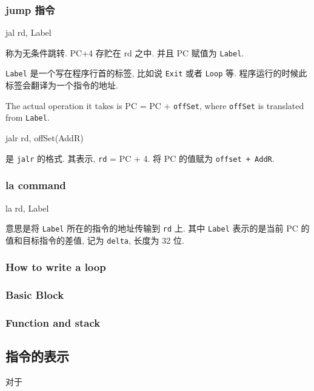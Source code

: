 \documentclass[12pt]{ctexart}
\theoremstyle{definition}
\theoremstyle{definition}
\theoremstyle{plain}
\begin{document}
\subsubsection{jump 指令}
\centerline{jal rd, Label}
称为无条件跳转. PC+4 存贮在 rd 之中. 并且 PC 赋值为 \texttt{Label}. 

\texttt{Label} 是一个写在程序行首的标签, 比如说 \texttt{Exit} 或者 \texttt{Loop} 等. 程序运行的时候此标签会翻译为一个指令的地址. 

The actual operation it takes is PC = PC + \texttt{offSet}, where \texttt{offSet} is translated from \texttt{Label}. 

\centerline{jalr rd, offSet(AddR)}
是 \texttt{jalr} 的格式. 其表示, \texttt{rd} = PC + 4. 将 PC 的值赋为 \texttt{offset + AddR}. 

\subsubsection{la command}
\centerline{la rd, Label}
意思是将 \texttt{Label} 所在的指令的地址传输到 \texttt{rd} 上. 其中 \texttt{Label} 表示的是当前 PC 的值和目标指令的差值, 记为 \texttt{delta}, 长度为 32 位. 
\subsubsection{How to write a loop}
\subsubsection{Basic Block}
\subsubsection{Function and stack}

\subsection{指令的表示}

对于

\end{document}
